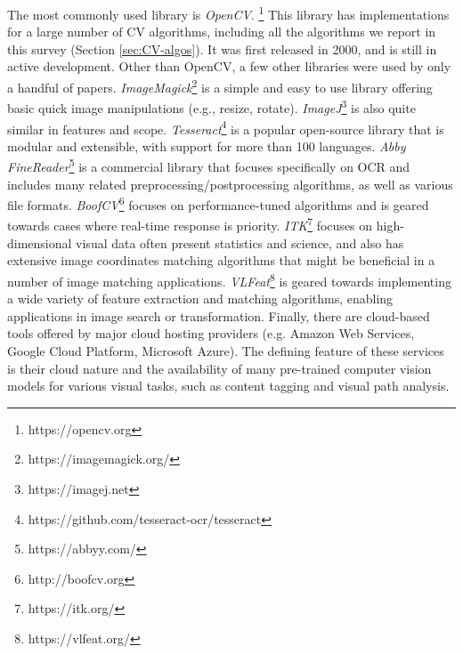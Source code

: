 {The most commonly used library is \emph{OpenCV}.
\footnote{https://opencv.org} This library has 
implementations for a large number of CV algorithms, 
including all the algorithms we report in this 
survey (Section \ref{sec:CV-algos}). It was first 
released in 2000, and is still in active development. 
Other than OpenCV, a few other libraries were used 
by only a handful of papers. 
\emph{ImageMagick}\footnote{https://imagemagick.org/} 
is a simple and easy to use library offering basic 
quick image manipulations (e.g.,  resize, rotate).  
\emph{ImageJ}\footnote{https://imagej.net} is also 
quite similar in features and scope.
\emph{Tesseract}\footnote{https://github.com/tesseract-ocr/tesseract} 
is a popular open-source library that is modular and extensible, 
with support for more than 100 languages.
\emph{Abby FineReader}\footnote{https://abbyy.com/} is 
a commercial library that focuses specifically on 
OCR and includes many related preprocessing/postprocessing 
algorithms, as well as various file formats.
\emph{BoofCV}\footnote{http://boofcv.org} focuses 
on performance-tuned algorithms and is geared 
towards cases where real-time response is priority.
\emph{ITK}\footnote{https://itk.org/} focuses on 
high-dimensional visual data often present 
statistics and science, and also has extensive 
image coordinates matching algorithms that 
might be beneficial in a number of image 
matching applications. 
\emph{VLFeat}\footnote{https://vlfeat.org/} is 
geared towards implementing a wide variety of 
feature extraction and matching algorithms, 
enabling applications in image search or transformation.
Finally, there are cloud-based tools offered by 
major cloud hosting providers (e.g. Amazon Web 
Services, Google Cloud Platform, Microsoft Azure). 
The defining feature of these services is their 
cloud nature and the availability of many 
pre-trained computer vision models for various 
visual tasks, such as content tagging and 
visual path analysis. 
}

